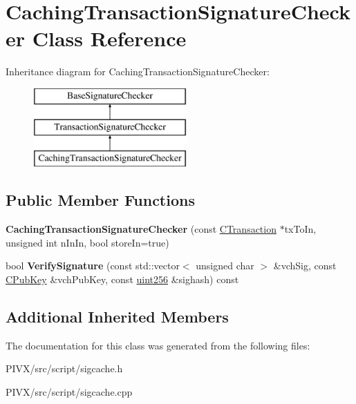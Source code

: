 \hypertarget{class_caching_transaction_signature_checker}{}\section{Caching\+Transaction\+Signature\+Checker Class Reference}
\label{class_caching_transaction_signature_checker}
Inheritance diagram for Caching\+Transaction\+Signature\+Checker\+:\begin{figure}[H]
\begin{center}
\leavevmode
\includegraphics[height=3.000000cm]{class_caching_transaction_signature_checker}
\end{center}
\end{figure}
\subsection*{Public Member Functions}
\begin{DoxyCompactItemize}
\item 
\mbox{\label{class_caching_transaction_signature_checker_a43369b09574bd1ac6327b7933c030c4f}} 
{\bfseries Caching\+Transaction\+Signature\+Checker} (const \mbox{\hyperlink{class_c_transaction}{C\+Transaction}} $\ast$tx\+To\+In, unsigned int n\+In\+In, bool store\+In=true)
\item 
\mbox{\label{class_caching_transaction_signature_checker_a8fb5c049a2f0ef3d4d3fbfeea88b7b53}} 
bool {\bfseries Verify\+Signature} (const std\+::vector$<$ unsigned char $>$ \&vch\+Sig, const \mbox{\hyperlink{class_c_pub_key}{C\+Pub\+Key}} \&vch\+Pub\+Key, const \mbox{\hyperlink{classuint256}{uint256}} \&sighash) const
\end{DoxyCompactItemize}
\subsection*{Additional Inherited Members}


The documentation for this class was generated from the following files\+:\begin{DoxyCompactItemize}
\item 
P\+I\+V\+X/src/script/sigcache.\+h\item 
P\+I\+V\+X/src/script/sigcache.\+cpp\end{DoxyCompactItemize}
